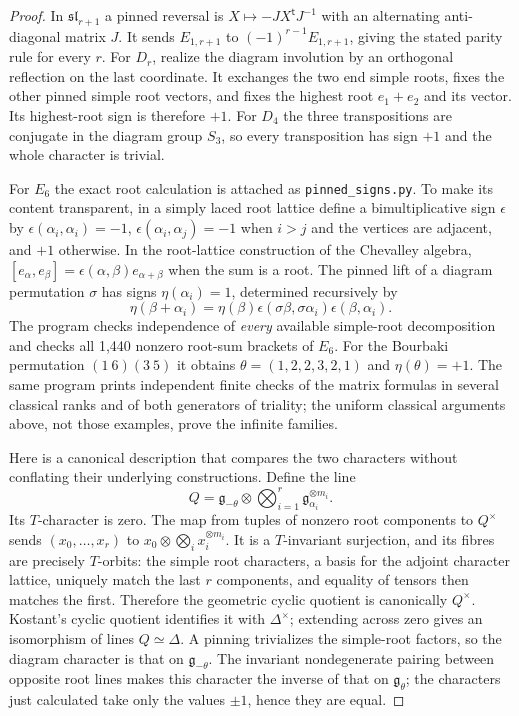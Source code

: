 \begin{proof}
In $\mathfrak{sl}_{r+1}$ a pinned reversal is
$X\mapsto-JX^{\mathsf t}J^{-1}$ with an alternating anti-diagonal
matrix $J$.  It sends $E_{1,r+1}$ to
$(-1)^{r-1}E_{1,r+1}$, giving the stated parity rule for every $r$.
For $D_r$, realize the diagram involution by an orthogonal reflection
on the last coordinate.  It exchanges the two end simple roots, fixes
the other pinned simple root vectors, and fixes the highest root
$e_1+e_2$ and its vector.  Its highest-root sign is therefore $+1$.
For $D_4$ the three transpositions are conjugate in the diagram group
$S_3$, so every transposition has sign $+1$ and the whole character is
trivial.

For $E_6$ the exact root calculation is attached as
\texttt{pinned\_signs.py}.  To make its content transparent, in a
simply laced root lattice define a bimultiplicative sign $\epsilon$
by $\epsilon(\alpha_i,\alpha_i)=-1$,
$\epsilon(\alpha_i,\alpha_j)=-1$ when $i>j$ and the vertices are
adjacent, and $+1$ otherwise.  In the root-lattice construction of
the Chevalley algebra, $[e_\alpha,e_\beta]=
\epsilon(\alpha,\beta)e_{\alpha+\beta}$ when the sum is a root.
The pinned lift of a diagram permutation $\sigma$ has signs
$\eta(\alpha_i)=1$, determined recursively by
\[
\eta(\beta+\alpha_i)=\eta(\beta)
 \epsilon(\sigma\beta,\sigma\alpha_i)\epsilon(\beta,\alpha_i).
\]
The program checks independence of \emph{every} available simple-root
decomposition and checks all 1,440 nonzero root-sum brackets of $E_6$.
For the Bourbaki permutation $(1\ 6)(3\ 5)$ it obtains
$\theta=(1,2,2,3,2,1)$ and $\eta(\theta)=+1$.
The same program prints independent finite checks of the matrix formulas
in several classical ranks and of both generators of triality; the
uniform classical arguments above, not those examples, prove the
infinite families.

Here is a canonical description that compares the two characters
without conflating their underlying constructions.  Define the line
\[
 Q=\mathfrak g_{-\theta}\otimes
       \bigotimes_{i=1}^r\mathfrak g_{\alpha_i}^{\otimes m_i}.
\]
Its $T$-character is zero.  The map from tuples of nonzero root
components to $Q^\times$ sends $(x_0,\ldots,x_r)$ to
$x_0\otimes\bigotimes_i x_i^{\otimes m_i}$.  It is a $T$-invariant
surjection, and its fibres are precisely $T$-orbits: the simple root
characters, a basis for the adjoint character lattice, uniquely match
the last $r$ components, and equality of tensors then matches the
first.  Therefore the geometric cyclic quotient is canonically
$Q^\times$.  Kostant's cyclic quotient identifies it with
$\Delta^\times$; extending across zero gives an isomorphism of lines
$Q\simeq\Delta$.  A pinning trivializes the simple-root factors,
so the diagram character is that on $\mathfrak g_{-\theta}$.
The invariant nondegenerate pairing between opposite root lines makes
this character the inverse of that on $\mathfrak g_\theta$; the
characters just calculated take only the values $\pm1$, hence they
are equal.


\end{proof}
